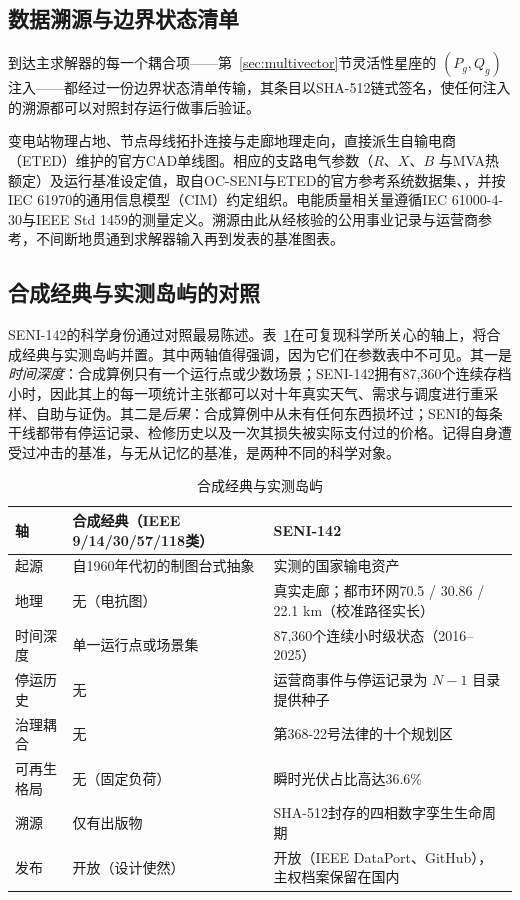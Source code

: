 \subsection{数据溯源与边界状态清单}
\label{sub:provenance}

到达主求解器的每一个耦合项——第~\ref{sec:multivector}节灵活性星座的 $(P_g, Q_g)$ 注入——都经过一份边界状态清单传输，其条目以SHA-512链式签名，使任何注入的溯源都可以对照封存运行做事后验证。

变电站物理占地、节点母线拓扑连接与走廊地理走向，直接派生自输电商（ETED）维护的官方CAD单线图。相应的支路电气参数（$R$、$X$、$B$ 与MVA热额定）及运行基准设定值，取自OC-SENI与ETED的官方参考系统数据集\cite{ocseni}、\cite{eted}，并按IEC 61970的通用信息模型（CIM）约定\cite{iec61970}组织。电能质量相关量遵循IEC 61000-4-30\cite{iec61000}与IEEE Std 1459\cite{ieee1459}的测量定义。溯源由此从经核验的公用事业记录与运营商参考，不间断地贯通到求解器输入再到发表的基准图表。

\subsection{合成经典与实测岛屿的对照}
\label{sub:canon}

SENI-142的科学身份通过对照最易陈述。表~\ref{tab:canon}在可复现科学所关心的轴上，将合成经典与实测岛屿并置。其中两轴值得强调，因为它们在参数表中不可见。其一是\emph{时间深度}：合成算例只有一个运行点或少数场景；SENI-142拥有87,360个连续存档小时，因此其上的每一项统计主张都可以对十年真实天气、需求与调度进行重采样、自助与证伪。其二是\emph{后果}：合成算例中从未有任何东西损坏过；SENI的每条干线都带有停运记录、检修历史以及一次其损失被实际支付过的价格。记得自身遭受过冲击的基准，与无从记忆的基准，是两种不同的科学对象。

\begin{table}[!t]
\caption{合成经典与实测岛屿}
\label{tab:canon}
\centering
\footnotesize
\begin{tabular}{@{}l p{} p{}@{}}
\toprule
\textbf{轴} & \textbf{合成经典（IEEE 9/14/30/57/118类）} & \textbf{SENI-142} \\
\midrule
起源 & 自1960年代初的制图台式抽象 & 实测的国家输电资产 \\
地理 & 无（电抗图） & 真实走廊；都市环网70.5 / 30.86 / 22.1 km（校准路径实长） \\
时间深度 & 单一运行点或场景集 & 87,360个连续小时级状态（2016--2025） \\
停运历史 & 无 & 运营商事件与停运记录为 $N-1$ 目录提供种子 \\
治理耦合 & 无 & 第368-22号法律的十个规划区 \\
可再生格局 & 无（固定负荷） & 瞬时光伏占比高达36.6\% \\
溯源 & 仅有出版物 & SHA-512封存的四相数字孪生生命周期 \\
发布 & 开放（设计使然） & 开放（IEEE DataPort、GitHub），主权档案保留在国内 \\
\bottomrule
\end{tabular}
\end{table}
